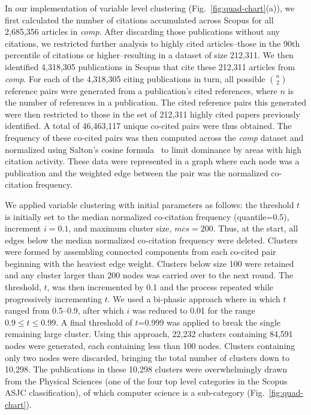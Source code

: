 In our implementation of variable level clustering (Fig.~\ref{fig:quad-chart}(a)), we first calculated the number of citations accumulated across Scopus for all 2,685,356 articles in \emph{comp}. After discarding those publications without any citations, we restricted further analysis to highly cited articles--those in the 90th percentile of citations or higher--resulting in a dataset of size 212,311. We then identified 4,318,305 publications in Scopus that cite these 212,311 articles from \emph{comp}. For each of the 4,318,305 citing publications in turn, all possible ${n \choose 2}$ reference pairs were generated from a publication's cited references, where $n$ is the number of references in a publication. The cited reference pairs this generated were then restricted to those in the set of 212,311 highly cited papers previously identified. A total of 46,463,117 unique co-cited pairs were thus obtained. 
The frequency of these co-cited pairs was then computed across the \emph{comp} dataset  and normalized using Salton's cosine formula~\cite{salton_citation_1979} to limit dominance by areas with high citation activity. These data were represented in a graph where each node was a publication and the weighted edge between the pair was the normalized co-citation frequency. \par 

We applied variable clustering with initial parameters as follows: the threshold  $t$  is initially set to  the median normalized co-citation frequency (quantile=0.5), increment $i = 0.1$, and maximum cluster size, $mcs=200$. Thus, at the start, all edges below the median normalized co-citation frequency were deleted. Clusters were formed by assembling connected components from each co-cited pair beginning with the heaviest edge weight. Clusters below size 100 were retained and any cluster larger than 200 nodes was carried over to the next round. The threshold, $t$, was then incremented by 0.1 and the process repeated while progressively incrementing $t$.  We used a bi-phasic approach where in which $t$ ranged from 0.5--0.9, after which $i$ was reduced to 0.01 for the range $0.9 \leq t \leq 0.99$. A final threshold of $t$=0.999 was applied to break the single remaining large cluster.  Using this approach, 22,232 clusters containing 84,591 nodes were generated, each containing less than 100 nodes. Clusters containing only two nodes were discarded, bringing the total number of clusters down to 10,298. The publications in these 10,298 clusters were overwhelmingly drawn from the Physical Sciences (one of the four top level categories in the Scopus ASJC classification), of which computer science is a sub-category (Fig.~\ref{fig:quad-chart}).

